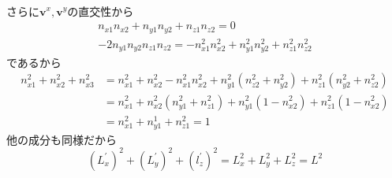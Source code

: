 \documentclass[uplatex,dvipdfmx, a4paper,11pt]{jsarticle}
\begin{document}
\begin{enumerate}[1.]
\begin{enumerate}[1）]
\begin{align*}
        \end{align*}
        さらに$\bm{v}^x,\bm{v}^y$の直交性から
        \begin{gather*}
            n_{x1}n_{x2}+n_{y1}n_{y2}+n_{z1}n_{z2}=0\\
            -2n_{y1}n_{y2}n_{z1}n_{z2}=-n_{x1}^2n_{x2}^2+n_{y1}^2n_{y2}^2+n_{z1}^2n_{z2}^2
        \end{gather*}
        であるから
        \begin{align*}
            n_{x1}^2+n_{x2}^2+n_{x3}^2&=n_{x1}^2+n_{x2}^2-n_{x1}^2n_{x2}^2+n_{y1}^2(n_{z2}^2+n_{y2}^2)+n_{z1}^2(n_{y2}^2+n_{z2}^2)\\
            &=n_{x1}^2+n_{x2}^2(n_{y1}^2+n_{z1}^2)+n_{y1}^2(1-n_{x2}^2)+n_{z1}^2(1-n_{x2}^2)\\
            &=n_{x1}^2+n_{y1}^1+n_{z1}^2=1
        \end{align*}    
        他の成分も同様だから
        \begin{equation}
            (L_x^{\prime})^2+(L_y^{\prime})^2+(l_z^{\prime})^2=L_x^2+L_y^2+L_z^2=L^2
        \end{equation}
    \end{enumerate}

\end{enumerate}
\end{document}
